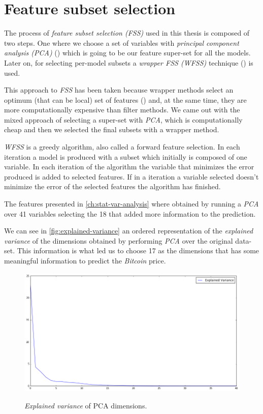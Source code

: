 
\chapter{Feature subset selection}
\label{ch:feature-selection}

The process of \textit{feature subset selection (FSS)} used in this
thesis is composed of two steps. One where we choose a set of
variables with \textit{principal component analysis (PCA)}
(\cite{pearson1901liii}) which is going to be our feature super-set
for all the models. Later on, for selecting per-model subsets a
\textit{wrapper FSS (WFSS)} technique (\cite{kohavi1997wrappers}) is
used.

This approach to \textit{FSS} has been taken because wrapper methods
select an optimum (that can be local) set of features
(\cite{inza2004filter, kumari2011filter}) and, at the same time, they
are more computationally expensive than filter methods. We came out
with the mixed approach of selecting a super-set with \textit{PCA},
which is computationally cheap and then we selected the final subsets
with a wrapper method.

\textit{WFSS} is a greedy algorithm, also called a forward feature
selection. In each iteration a model is produced with a subset which
initially is composed of one variable. In each iteration of the
algorithm the variable that minimizes the error produced is added to
selected features. If in a iteration a variable selected doesn't
minimize the error of the selected features the algorithm has
finished.

The features presented in \autoref{ch:stat-var-analysis} where
obtained by running a \textit{PCA} over 41 variables selecting the 18
that added more information to the prediction.

We can see in \autoref{fig:explained-variance} an ordered
representation of the \textit{explained variance} of the dimensions
obtained by performing \textit{PCA} over the original data-set. This
information is what led us to choose 17 as the dimensions that has
some meaningful information to predict the \textit{Bitcoin} price.

\begin{figure}[bth]
  \myfloatalign
  {\includegraphics[width=1\linewidth]
    {gfx/explained-variance}}
  \caption{\textit{Explained variance} of PCA dimensions.}
  \label{fig:explained-variance}
\end{figure}

